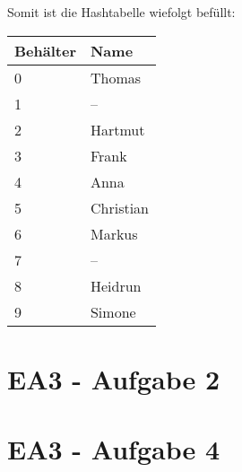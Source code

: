 \documentclass[12pt]{article}
\begin{document}
Somit ist die Hashtabelle wiefolgt befüllt:
\\

\begin{tabular}{|l|l|}
\hline
Behälter        & Name  \\
\hline
\hline
0 & Thomas \\
\hline
1 & -- \\
\hline
2 & Hartmut \\
\hline
3 & Frank \\
\hline
4 & Anna \\
\hline
5 & Christian \\
\hline
6 & Markus \\
\hline
7 & -- \\
\hline
8 & Heidrun \\
\hline
9 & Simone \\
\hline
\end{tabular}

\section*{EA3 - Aufgabe 2}
\section*{EA3 - Aufgabe 4}
\end{document}
